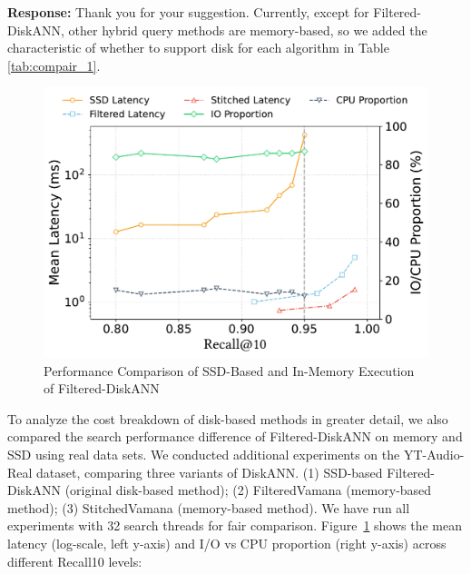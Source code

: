 \documentclass[sigconf, nonacm]{acmart}
\begin{document}
\noindent
\textbf{Response:} 
Thank you for your suggestion. Currently, except for Filtered-DiskANN, other hybrid query methods are memory-based, so we added the characteristic of whether to support disk for each algorithm in Table \ref{tab:compair_1}.
\begin{figure}[htbp]
	\centering
	\includegraphics[width=\linewidth]{fig/recall_latency_all.pdf}
	\caption{Performance Comparison of SSD-Based and In-Memory Execution of Filtered-DiskANN}
	\label{fig:recall-latency}
\end{figure}

 To analyze the cost breakdown of disk-based methods in greater detail, we also compared the search performance difference of Filtered-DiskANN on memory and SSD using real data sets. 
We conducted additional experiments on the YT-Audio-Real dataset, comparing three variants of DiskANN.
(1) SSD-based Filtered-DiskANN (original disk-based method);
(2) FilteredVamana (memory-based method);
(3) StitchedVamana (memory-based method).
We have run all experiments with 32 search threads for fair comparison. Figure~\ref{fig:recall-latency} shows the mean latency (log-scale, left y-axis) and I/O vs CPU proportion (right y-axis) across different Recall\@10 levels:

\end{document}

